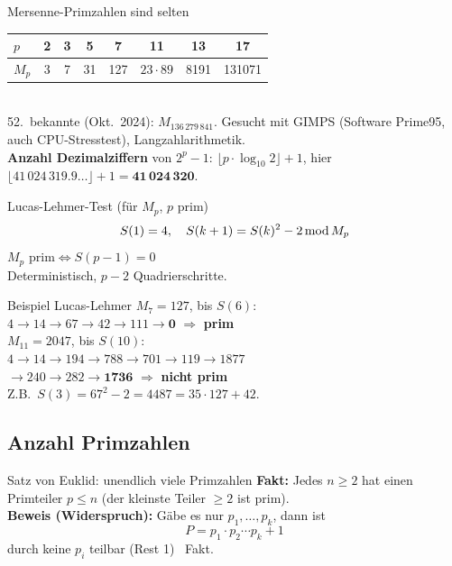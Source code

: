 \documentclass[a4paper, fontsize=7pt]{scrartcl}
\newcommand{\Mod}{\mskip3mu\mathrm{mod}\mskip3mu}
\begin{document}
\begin{subbox}{Mersenne-Primzahlen sind selten}
\setlength{\tabcolsep}{2.5pt}
\begin{tabular}{@{}l|ccccccc@{}}
$p$ & 2 & 3 & 5 & 7 & 11 & 13 & 17 \\ \hline
$M_p$ & 3 & 7 & 31 & 127 & $23 \cdot 89$ & 8191 & 131071
\end{tabular}\\[2pt]
52.\ bekannte (Okt.\ 2024): $M_{136\,279\,841}$. Gesucht mit GIMPS
(Software Prime95, auch CPU-Stresstest), Langzahlarithmetik.\\
\textbf{Anzahl Dezimalziffern} von $2^p - 1$:
$\lfloor p \cdot \log_{10} 2 \rfloor + 1$, hier
$\lfloor 41\,024\,319.9\ldots \rfloor + 1 = \mathbf{41\,024\,320}$.
\end{subbox}

\begin{mainbox}{Lucas-Lehmer-Test (für $M_p$, $p$ prim)}
$$S(1) = 4, \quad S(k + 1) = S(k)^2 - 2 \Mod M_p$$
$\boxed{M_p \text{ prim} \iff S(p - 1) = 0}$\\
Deterministisch, $p - 2$ Quadrierschritte.
\end{mainbox}

\begin{subbox}{Beispiel Lucas-Lehmer}
\textbf{$M_7 = 127$}, bis $S(6)$:\\
$4 \to 14 \to 67 \to 42 \to 111 \to \mathbf{0}$ $\Rightarrow$ \textbf{prim}\\
\textbf{$M_{11} = 2047$}, bis $S(10)$:\\
$4 \to 14 \to 194 \to 788 \to 701 \to 119 \to 1877$\\
$\to 240 \to 282 \to \mathbf{1736}$ $\Rightarrow$ \textbf{nicht prim}\\
Z.B.\ $S(3) = 67^2 - 2 = 4487 = 35 \cdot 127 + 42$.
\end{subbox}

\subsection{Anzahl Primzahlen}

\begin{mainbox}{Satz von Euklid: unendlich viele Primzahlen}
\textbf{Fakt:} Jedes $n \ge 2$ hat einen Primteiler $p \le n$ (der kleinste
Teiler $\ge 2$ ist prim).\\
\textbf{Beweis (Widerspruch):} Gäbe es nur $p_1, \ldots, p_k$, dann ist
$$P = p_1 \cdot p_2 \cdots p_k + 1$$
durch keine $p_i$ teilbar (Rest 1) \lightning\ Fakt.
\end{mainbox}
\end{document}
